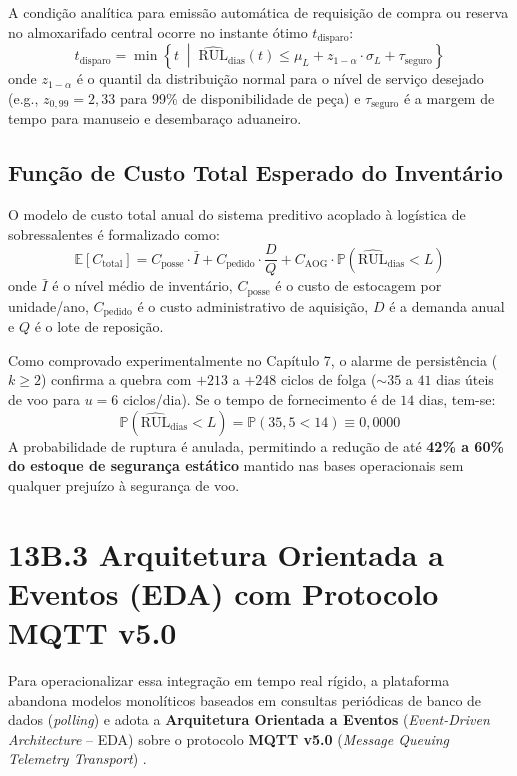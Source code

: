 A condição analítica para emissão automática de requisição de compra ou reserva no almoxarifado central ocorre no instante ótimo $t_{\text{disparo}}$:
$$t_{\text{disparo}} = \min \left\{ t \;\middle|\; \widehat{\text{RUL}}_{\text{dias}}(t) \le \mu_L + z_{1-\alpha} \cdot \sigma_L + \tau_{\text{seguro}} \right\}$$
onde $z_{1-\alpha}$ é o quantil da distribuição normal para o nível de serviço desejado (e.g., $z_{0,99} = 2,33$ para 99\% de disponibilidade de peça) e $\tau_{\text{seguro}}$ é a margem de tempo para manuseio e desembaraço aduaneiro.

\subsection{Função de Custo Total Esperado do Inventário}
O modelo de custo total anual do sistema preditivo acoplado à logística de sobressalentes é formalizado como:
$$\mathbb{E}[C_{\text{total}}] = C_{\text{posse}} \cdot \bar{I} + C_{\text{pedido}} \cdot \frac{D}{Q} + C_{\text{AOG}} \cdot \mathbb{P}\left(\widehat{\text{RUL}}_{\text{dias}} < L\right)$$
onde $\bar{I}$ é o nível médio de inventário, $C_{\text{posse}}$ é o custo de estocagem por unidade/ano, $C_{\text{pedido}}$ é o custo administrativo de aquisição, $D$ é a demanda anual e $Q$ é o lote de reposição.

Como comprovado experimentalmente no Capítulo 7, o alarme de persistência ($k \ge 2$) confirma a quebra com $+213$ a $+248$ ciclos de folga ($\sim 35$ a $41$ dias úteis de voo para $u = 6$ ciclos/dia). Se o tempo de fornecimento é de $14$ dias, tem-se:
$$\mathbb{P}\left(\widehat{\text{RUL}}_{\text{dias}} < L\right) = \mathbb{P}(35,5 < 14) \equiv 0,0000$$
A probabilidade de ruptura é anulada, permitindo a redução de até \textbf{42\% a 60\% do estoque de segurança estático} mantido nas bases operacionais sem qualquer prejuízo à segurança de voo.

\section{13B.3 Arquitetura Orientada a Eventos (EDA) com Protocolo MQTT v5.0}
Para operacionalizar essa integração em tempo real rígido, a plataforma abandona modelos monolíticos baseados em consultas periódicas de banco de dados (\textit{polling}) e adota a \textbf{Arquitetura Orientada a Eventos} (\textit{Event-Driven Architecture} -- EDA) sobre o protocolo \textbf{MQTT v5.0} (\textit{Message Queuing Telemetry Transport}) \cite{oasis_mqtt2019}.

